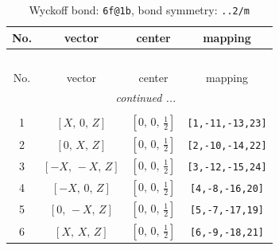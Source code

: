 \documentclass[fleqn,8pt]{jsarticle}
\begin{document}
\begin{longtable}{cccc}
\caption{Wyckoff bond: {\tt 6f@1b}, bond symmetry: {\tt ..2/m}}
 \\
 \hline \hline
No. & vector & center & mapping \\ \hline \endfirsthead

\multicolumn{3}{l}{\tablename\ \thetable{}} \\
 \hline \hline
No. & vector & center & mapping \\ \hline \endhead

 \hline \hline
\multicolumn{3}{r}{\footnotesize\it continued ...} \\ \endfoot

 \hline \hline
\multicolumn{3}{r}{} \\ \endlastfoot

1 & $\left[ X,\, 0,\, Z \right]$ & $\left[ 0,\, 0,\, \frac{1}{2} \right]$ & {\tt [1,-11,-13,23]} \\ \hline
2 & $\left[ 0,\, X,\, Z \right]$ & $\left[ 0,\, 0,\, \frac{1}{2} \right]$ & {\tt [2,-10,-14,22]} \\ \hline
3 & $\left[ - X,\, - X,\, Z \right]$ & $\left[ 0,\, 0,\, \frac{1}{2} \right]$ & {\tt [3,-12,-15,24]} \\ \hline
4 & $\left[ - X,\, 0,\, Z \right]$ & $\left[ 0,\, 0,\, \frac{1}{2} \right]$ & {\tt [4,-8,-16,20]} \\ \hline
5 & $\left[ 0,\, - X,\, Z \right]$ & $\left[ 0,\, 0,\, \frac{1}{2} \right]$ & {\tt [5,-7,-17,19]} \\ \hline
6 & $\left[ X,\, X,\, Z \right]$ & $\left[ 0,\, 0,\, \frac{1}{2} \right]$ & {\tt [6,-9,-18,21]} \\
\end{longtable}
\renewcommand{\arraystretch}{1.2}
\end{document}
